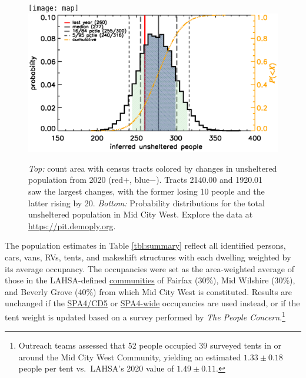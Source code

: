 \documentclass[11pt]{article}
\begin{document}
\begin{figure}
	\centering
	\texttt{[image: map]}
	\includegraphics[width=\linewidth, trim = 0cm 0cm 0cm 0cm]{mcw2021Hist}
	\caption{{\it Top:} count area with census tracts colored by  
			changes in unsheltered population from 2020 (red$+$, blue$-$).
			Tracts 2140.00 and 1920.01 saw the largest changes, with the former losing
			10 people and the latter rising by 20. 
			{\it Bottom:} Probability distributions for the total unsheltered population 
			in Mid City West.
			Explore the data at \url{https://pit.demoply.org}.}
	\label{fig:tcomp}
\end{figure} 

 The population estimates in Table \ref{tbl:summary} reflect all 
identified persons, cars, vans, RVs, tents, and makeshift structures with each
dwelling weighted by its average occupancy. The occupancies were set as the area-weighted 
average of those in the LAHSA-defined 
\href{https://www.lahsa.org/documents?id=4686-2020-greater-los-angeles-city-community-homelessness-report-service-planning-area-4.pdf}{communities} of Fairfax (30\%), Mid Wilshire (30\%), and 
Beverly Grove (40\%) from which Mid City West is constituted. Results are unchanged if 
the \href{https://www.lahsa.org/documents?id=4635-usc-2018-2020-multipliers-and-estimates-overview}
{SPA4/CD5} or \href{https://www.lahsa.org/documents?id=4693-2020-greater-los-angeles-homeless-count-cvrtm-conversion-factors}{SPA4-wide} occupancies are used instead, or if the tent weight is 
updated based on a survey performed by {\it The People Concern}.\footnote{Outreach teams 
assessed that 52 people occupied 39 surveyed tents in or around the Mid City West Community,
yielding an estimated $1.33\pm0.18$ people per tent vs.~LAHSA's 2020 value of $1.49\pm0.11$.}
\end{document}

